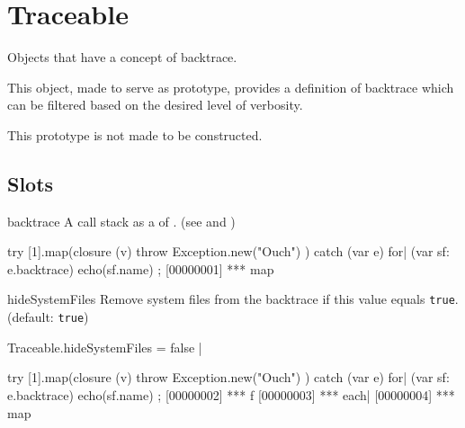 
\section{Traceable}
Objects that have a concept of backtrace.

This object, made to serve as prototype, provides a definition of backtrace
which can be filtered based on the desired level of verbosity.

This prototype is not made to be constructed.

\subsection{Slots}

\begin{urbiscriptapi}
\item[backtrace] A call stack as a  of
  .  (see  and
  )
\begin{urbiscript}
try
{
  [1].map(closure (v) { throw Exception.new("Ouch") })
}
catch (var e)
{
  for| (var sf: e.backtrace)
    echo(sf.name)
};
[00000001] *** map
\end{urbiscript}

\item[hideSystemFiles] Remove system files from the backtrace if this value
  equals \lstinline|true|.  (default: \lstinline|true|)
\begin{urbiscript}
Traceable.hideSystemFiles = false |

try
{
  [1].map(closure (v) { throw Exception.new("Ouch") })
}
catch (var e)
{
  for| (var sf: e.backtrace)
    echo(sf.name)
};
[00000002] *** f
[00000003] *** each|
[00000004] *** map
\end{urbiscript}

\end{urbiscriptapi}



